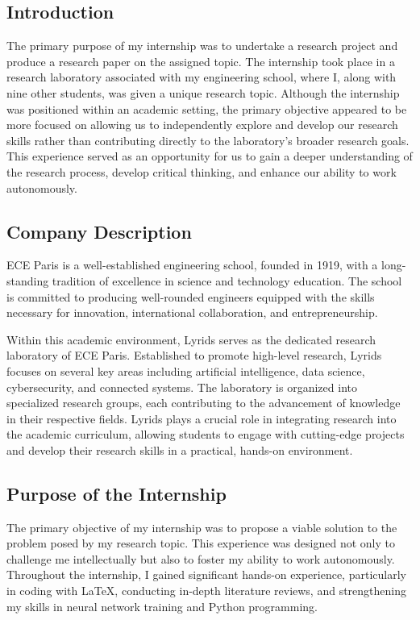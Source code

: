 \subsection{Introduction}\label{subsec:introduction}
The primary purpose of my internship was to undertake a research project and produce a research paper on the assigned
topic.
The internship took place in a research laboratory associated with my engineering school, where I, along with
nine other students, was given a unique research topic.
Although the internship was positioned within an academic setting, the primary objective appeared to be more focused on
allowing us to independently explore and develop our research skills rather than contributing directly to the
laboratory's broader research goals.
This experience served as an opportunity for us to gain a deeper understanding of the research process, develop critical
thinking, and enhance our ability to work autonomously.

\subsection{Company Description}\label{subsec:company-description}
ECE Paris is a well-established engineering school, founded in 1919, with a long-standing tradition of excellence in
science and technology education.
The school is committed to producing well-rounded engineers equipped with the skills necessary for innovation,
international collaboration, and entrepreneurship.

Within this academic environment, Lyrids serves as the dedicated research laboratory of ECE Paris.
Established to promote high-level research, Lyrids focuses on several key areas including artificial intelligence, data
science,
cybersecurity, and connected systems.
The laboratory is organized into specialized research groups, each contributing to the advancement of knowledge in their
respective fields.
Lyrids plays a crucial role in integrating research into the academic curriculum, allowing students to engage with
cutting-edge projects and develop their research skills in a practical, hands-on environment.

\subsection{Purpose of the Internship}\label{subsec:purpose-of-the-internship}
The primary objective of my internship was to propose a viable solution to the problem posed by my research topic.
This experience was designed not only to challenge me intellectually but also to foster my ability to work autonomously.
Throughout the internship, I gained significant hands-on experience, particularly in coding with \LaTeX{}, conducting
in-depth literature reviews, and strengthening my skills in neural network training and Python programming.

